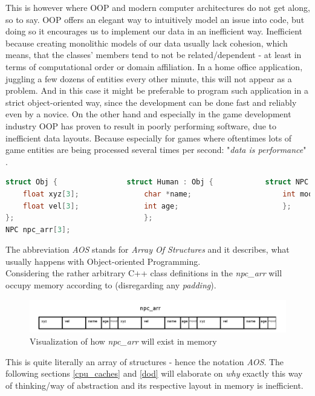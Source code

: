  This is however where OOP and modern computer architectures do not get along, so to say. OOP offers an elegant way to intuitively model an issue into code, but doing so it encourages us to implement our data in an inefficient way. Inefficient because creating monolithic models of our data usually lack cohesion, which means, that the classes' members tend to not be related/dependent  - at least in terms of computational order or domain affiliation. In a home office application, juggling a few dozens of entities every other minute, this will not appear as a problem. And in this case it might be preferable to program such application in a strict object-oriented way, since the development can be done fast and reliably even by a novice. On the other hand and especially in the game development industry OOP has proven to result in poorly performing software, due to inefficient data layouts. Because especially for games where oftentimes lots of game entities are being processed several times per second: "\textit{data is performance}" .
 \begin{lstlisting}[language=C++,numbers=none,name={Example of some hierarchical POD class definitions},label={pods}]
struct Obj {				struct Human : Obj {			struct NPC : Human {
	float xyz[3];				char *name;						int mood;
	float vel[3];				int age;						};
};								};
NPC npc_arr[3];
 \end{lstlisting}
The abbreviation \textit{AOS} stands for \textit{Array Of Structures}  and it describes, what usually happens with Object-oriented Programming.\\
Considering the rather arbitrary C++ class definitions in  the \textit{npc\_arr} will occupy memory according to  (disregarding any \textit{padding}).
\begin{figure}[!htbp]
	\centering
	\includegraphics[width=1.0\linewidth]{PICs/npcs_in_memory}
	\caption{Visualization of how \textit{npc\_arr} will exist in memory}\label{npcs_in_memory}
\end{figure}
This is quite literally an array of structures - hence the notation \textit{AOS}. The following sections \ref{cpu_caches} and \ref{dod} will elaborate on \textit{why} exactly this way of thinking/way of abstraction and its respective layout in memory is inefficient.

